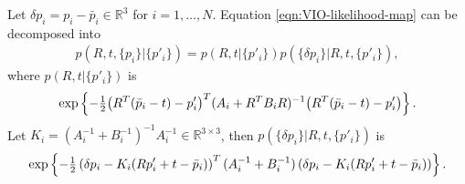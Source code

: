 \begin{lemma} \label{lemma:VIO-likelihood-map-factor}
	Let $\delta p_i = p_i-\bar{p}_i \in \mathbb{R}^3$ for $i=1,\dots,N$. Equation \eqref{eqn:VIO-likelihood-map} can be decomposed into
	\begin{align}
		p(R,t,\{p_i\}|\{p'_i\}) = p(R,t|\{p'_i\}) p(\{\delta p_i\}|R,t,\{p'_i\}),
	\end{align}
	where $p(R,t|\{p'_i\})$ is
	\begin{align} \label{eqn:VIO-likelihood-map-Rt}
		\exp\left\{ -\tfrac{1}{2} \big(R^T(\bar{p}_i-t)-p'_i\big)^T (A_i+R^TB_iR)^{-1} \big(R^T(\bar{p}_i-t)-p'_i\big) \right\}.
	\end{align}
	Let $K_i = (A_i^{-1}+B_i^{-1})^{-1} A_i^{-1} \in \mathbb{R}^{3\times 3}$, then $p(\{\delta p_i\}|R,t,\{p'_i\})$ is
	\begin{align} \label{eqn:VIO-likelihood-map-p}
		\exp\left\{ -\tfrac{1}{2}\left( \delta p_i - K_i(Rp'_i+t-\bar{p}_i) \right)^T (A_i^{-1}+B_i^{-1}) \left( \delta p_i - K_i(Rp'_i+t-\bar{p}_i) \right) \right\}.
	\end{align}
\end{lemma}
